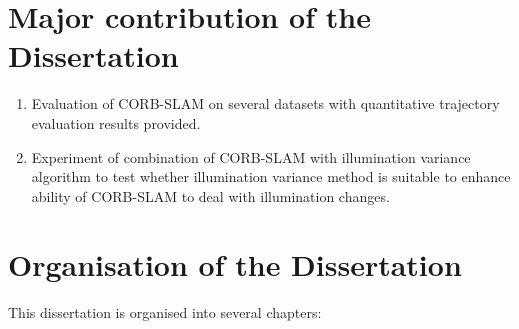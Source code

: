 \section{Major contribution of the Dissertation}
\begin{enumerate}[1.]
	\item Evaluation of CORB-SLAM on several datasets with quantitative trajectory evaluation results provided.
	\item Experiment of combination of CORB-SLAM with illumination variance algorithm to test whether illumination variance method is suitable to enhance ability of CORB-SLAM to deal with illumination changes.
\end{enumerate}

\section{Organisation of the Dissertation}
This dissertation is organised into several chapters:
